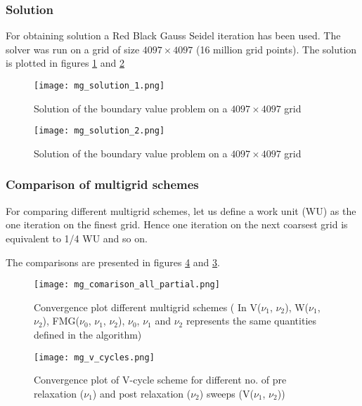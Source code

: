 \documentclass[a4paper]{report}
\begin{document}
	\subsubsection{Solution}
	For obtaining solution a Red Black Gauss Seidel iteration has been used. The solver was run on a grid of size $4097 \times 4097$ (16 million grid points). The solution is plotted in figures \ref{sol1} and \ref{sol2}
	
	\begin{figure}[hbtp]
	\centering
	\texttt{[image: mg\_solution\_1.png]}
	\caption{Solution of the boundary value problem on a $4097 \times 4097$ grid} \label{sol1}
	\end{figure}
	
	\begin{figure}[hbtp]
	\centering
	\texttt{[image: mg\_solution\_2.png]}
	\caption{Solution of the boundary value problem on a $4097 \times 4097$ grid} \label{sol2}
	\end{figure}
	
	\subsubsection{Comparison of multigrid schemes}
	For comparing different multigrid schemes, let us define a work unit (WU) as the one iteration on the finest grid.
	Hence one iteration on the next coarsest grid is equivalent to 1/4 WU and so on.
	
	The comparisons are presented in figures \ref{v_cycle_comparison} and \ref{mg_comparison}.
	
	\begin{figure}[hbtp]
	\centering
	\texttt{[image: mg\_comarison\_all\_partial.png]}
	\caption{Convergence plot different multigrid schemes ( In V($\nu_1$, $\nu_2$), W($\nu_1$, $\nu_2$), FMG($\nu_0$, $\nu_1$, $\nu_2$), $\nu_0$, $\nu_1$ and $\nu_2$ represents the same quantities defined in the algorithm)} \label{mg_comparison}
	\end{figure}

	\begin{figure}[hbtp]
	\centering
	\texttt{[image: mg\_v\_cycles.png]}
	\caption{Convergence plot of V-cycle scheme for different no. of pre relaxation ($\nu_1$) and post relaxation ($\nu_2$) sweeps (V($\nu_1$, $\nu_2$))} \label{v_cycle_comparison}
	\end{figure}	
	
	\newpage	
	
\end{document}
